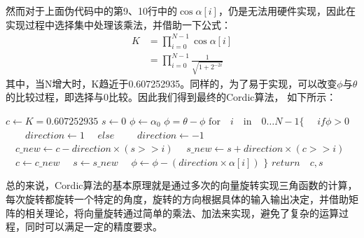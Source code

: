 \documentclass[a4paper,12pt]{report}
\begin{document}
然而对于上面伪代码中的第9、10行中的$\cos\alpha[i]$，仍是无法用硬件实现，因此在实现过程中选择集中处理该乘法，并借助一下公式：
\begin{equation}
\begin{aligned}
K &= \prod_{i=0}^{N-1}\cos\alpha[i]\\
  &= \prod_{i=0}^{N-1}\frac{1}{\sqrt{1 + 2^{-2i}}}
\end{aligned}
\end{equation}
其中，当N增大时，K趋近于0.607252935。同样的，为了易于实现，可以改变$\phi$与$\theta$的比较过程，即选择与0比较。因此我们得到最终的Cordic算法， 如下所示：
\begin{codebox}
\label{code5}
\li $c \leftarrow K = 0.607252935$
\li $s \leftarrow 0$
\li $\phi \leftarrow \alpha_0$
\li $\phi = \theta - \phi$
\li $\mathrm{for} \quad i \quad \mathrm{in} \quad 0\dots N-1 \{$
\li $\quad if \phi > 0$
\li $\quad \quad direction \leftarrow 1$
\li $\quad else $
\li $\quad \quad direction \leftarrow -1$
\li $\quad c\_new \leftarrow c - direction \times (s >> i)$
\li $\quad s\_new \leftarrow s + direction \times (c >> i)$
\li $\quad c \leftarrow c\_new$
\li $\quad s \leftarrow s\_new$
\li $\quad \phi \leftarrow \phi - (direction \times \alpha[i])$
\li $\}$
\li $return \quad c, s$
\end{codebox}
\par\indent 总的来说，Cordic算法的基本原理就是通过多次的向量旋转实现三角函数的计算，每次旋转都旋转一个特定的角度，旋转的方向根据具体的输入输出决定，并借助矩阵的相关理论，将向量旋转通过简单的乘法、加法来实现，避免了复杂的运算过程，同时可以满足一定的精度要求。
\end{document}
